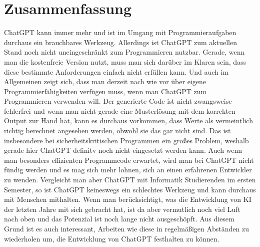 \documentclass[class=scrbook, crop=false]{standalone}
\begin{document}
\chapter{Zusammenfassung}
\label{ch:zusammenfassung}
    ChatGPT kann immer mehr und ist im Umgang mit Programmieraufgaben durchaus ein brauchbares Werkzeug.
    Allerdings ist ChatGPT zum aktuellen Stand noch nicht uneingeschränkt zum Programmieren nutzbar.
    Gerade, wenn man die kostenfreie Version nutzt, muss man sich darüber im Klaren sein, dass diese bestimmte Anforderungen einfach nicht erfüllen kann.
    Und auch im Allgemeinen zeigt sich, dass man derzeit nach wie vor über eigene Programmierfähigkeiten verfügen muss,
    wenn man ChatGPT zum Programmieren verwenden will.
    Der generierte Code ist nicht zwangsweise fehlerfrei und wenn man nicht gerade eine Musterlösung mit dem korrekten
    Output zur Hand hat, kann es durchaus vorkommen, dass Werte als vermeintlich richtig berechnet angesehen werden,
    obwohl sie das gar nicht sind.
    Das ist insbesondere bei sicherheitskritischen Programmen ein großes Problem, weshalb gerade hier ChatGPT definitv
    noch nicht eingesetzt werden kann.
    Auch wenn man besonders effizienten Programmcode erwartet, wird man bei ChatGPT nicht fündig werden und es mag sich
    mehr lohnen, sich an einen erfahrenen Entwickler zu wenden.
    Vergleicht man aber ChatGPT mit Informatik Studierenden im ersten Semester, so ist ChatGPT keineswegs ein schlechtes Werkzeug
    und kann durchaus mit Menschen mithalten.
    Wenn man berücksichtigt, was die Entwicklung von KI der letzten Jahre mit sich gebracht hat, ist da aber vermutlich
    noch viel Luft nach oben und das Potenzial ist noch lange nicht ausgeschöpft.
    Aus diesem Grund ist es auch interessant, Arbeiten wie diese in regelmäßigen Abständen zu wiederholen um, die
    Entwicklung von ChatGPT festhalten zu können.
\end{document}
